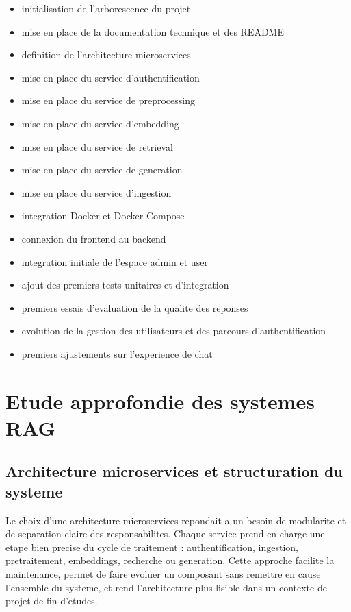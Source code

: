 \begin{itemize}
\item initialisation de l'arborescence du projet
\item mise en place de la documentation technique et des README
\item definition de l'architecture microservices
\item mise en place du service d'authentification
\item mise en place du service de preprocessing
\item mise en place du service d'embedding
\item mise en place du service de retrieval
\item mise en place du service de generation
\item mise en place du service d'ingestion
\item integration Docker et Docker Compose
\item connexion du frontend au backend
\item integration initiale de l'espace admin et user
\item ajout des premiers tests unitaires et d'integration
\item premiers essais d'evaluation de la qualite des reponses
\item evolution de la gestion des utilisateurs et des parcours d'authentification
\item premiers ajustements sur l'experience de chat
\end{itemize}

\section{Etude approfondie des systemes RAG}

\subsection{Architecture microservices et structuration du systeme}

Le choix d'une architecture microservices repondait a un besoin de modularite et de separation claire des responsabilites. Chaque service prend en charge une etape bien precise du cycle de traitement : authentification, ingestion, pretraitement, embeddings, recherche ou generation. Cette approche facilite la maintenance, permet de faire evoluer un composant sans remettre en cause l'ensemble du systeme, et rend l'architecture plus lisible dans un contexte de projet de fin d'etudes.

